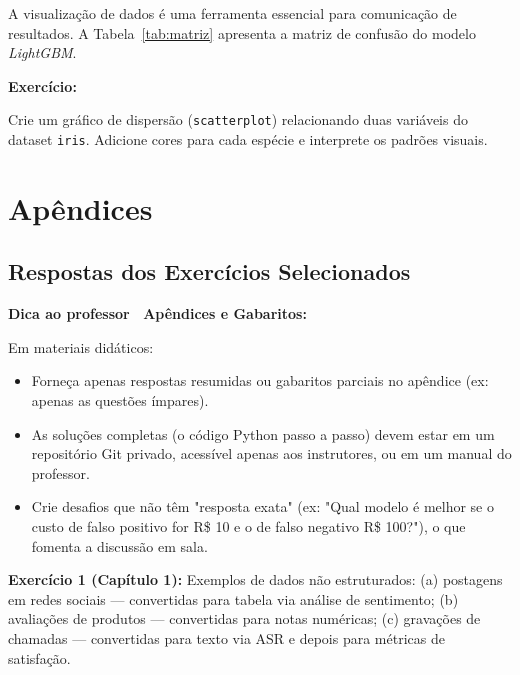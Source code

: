 \documentclass[
    12pt,
    oneside,
    a4paper,
    english,
    brazilian
    ]{abntex2}
\numberwithin{equation}{chapter}
\newenvironment{dica}{%
    \par\medskip
    \color{blue!60!black}\small\itshape
}{%
    \par\medskip
}
\newenvironment{exercicio}{%
    \par\medskip
    \color{teal!80!black}\small
    \noindent\textbf{Exercício: }\ignorespaces
}{%
    \par\medskip
}
\begin{document}
A visualização de dados é uma ferramenta essencial para comunicação de resultados. A Tabela~\ref{tab:matriz} apresenta a matriz de confusão do modelo \textit{LightGBM}.



\begin{exercicio}
Crie um gráfico de dispersão (\texttt{scatterplot}) relacionando duas variáveis do dataset \texttt{iris}. Adicione cores para cada espécie e interprete os padrões visuais.
\end{exercicio}

\newpage
{}
{}
\printindex

\newpage
\appendix
\part*{Apêndices}

\chapter{Respostas dos Exercícios Selecionados}

\begin{dica}
\noindent\textbf{Dica ao professor \textemdash\ Apêndices e Gabaritos:}

Em materiais didáticos:
\begin{itemize}
    \item Forneça apenas respostas resumidas ou gabaritos parciais no apêndice (ex: apenas as questões ímpares).
    \item As soluções completas (o código Python passo a passo) devem estar em um repositório Git privado, acessível apenas aos instrutores, ou em um manual do professor.
    \item Crie desafios que não têm "resposta exata" (ex: "Qual modelo é melhor se o custo de falso positivo for R\$ 10 e o de falso negativo R\$ 100?"), o que fomenta a discussão em sala.
\end{itemize}
\end{dica}

\noindent\textbf{Exercício 1 (Capítulo 1):} Exemplos de dados não estruturados: (a) postagens em redes sociais --- convertidas para tabela via análise de sentimento; (b) avaliações de produtos --- convertidas para notas numéricas; (c) gravações de chamadas --- convertidas para texto via ASR e depois para métricas de satisfação.
\end{document}
